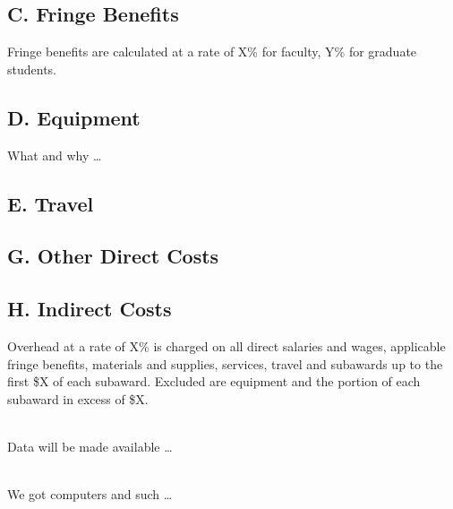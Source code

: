 \documentclass{proposalnsf}
\begin{document}
\subsection*{C. Fringe Benefits}
Fringe benefits are calculated at a rate of X\% for faculty, Y\% for graduate students.  

\subsection*{D. Equipment}
What and why \dots

\subsection*{E. Travel}
%

\subsection*{G. Other Direct Costs}

\subsection*{H. Indirect Costs}
Overhead at a rate of X\% is charged on all direct salaries and wages, applicable fringe benefits, materials and supplies, services, travel and subawards up to the first \$X of each subaward. Excluded are equipment and the portion of each subaward in excess of \$X.


\newpage
{}
\renewcommand{\thepage} {H--\arabic{page}}
\\

Data will be made available \dots



\newpage
{}
\renewcommand{\thepage} {I--\arabic{page}}
\\

We got computers and such \dots


\end{document}
